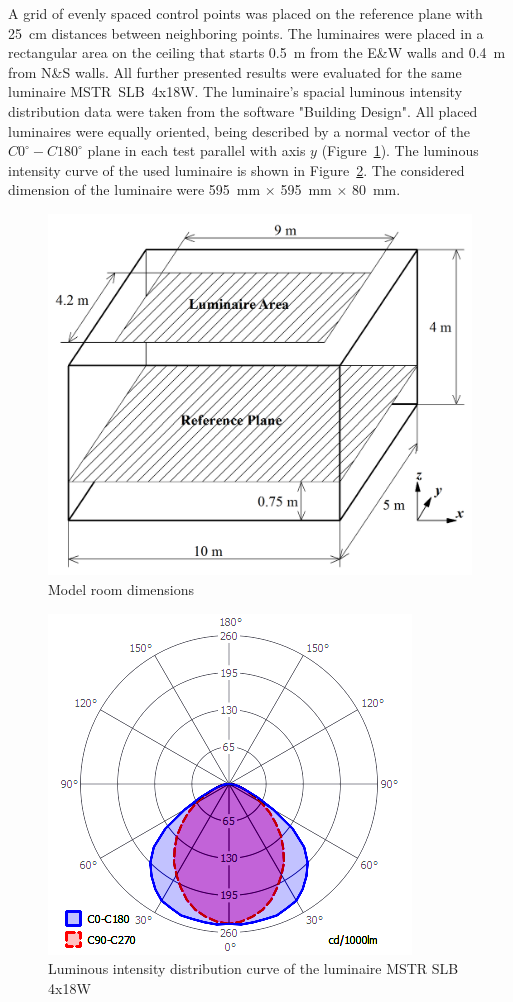 A grid of evenly spaced control points was placed on the reference plane with 25~cm distances between neighboring points. The luminaires were placed in a rectangular area on the ceiling that starts 0.5~m from the E\&W walls and 0.4~m from N\&S walls. All further presented results were evaluated for the same luminaire  MSTR~SLB~4x18W. The luminaire's spacial luminous intensity distribution data were taken from the software "Building Design". All placed luminaires were equally oriented, being described by a normal vector of the $C0^\circ-C180^\circ$ plane in each test parallel with axis $y$ (Figure~\ref{fig:modRoom}). The luminous intensity curve of the used luminaire is shown in Figure~\ref{fig:IDiag}. The considered dimension of the luminaire were 595~mm $\times$ 595~mm $\times$ 80~mm.

\begin{figure}[htb]
  \centering
  \includegraphics[width=\columnwidth]{modRoom}
  \caption{Model room dimensions}
  \label{fig:modRoom}
\end{figure}

\begin{figure}[htb]
  \centering
  \includegraphics[width=0.8\columnwidth]{IDiag}
  \caption{Luminous intensity distribution curve of the luminaire MSTR SLB 4x18W}
  \label{fig:IDiag}
\end{figure}